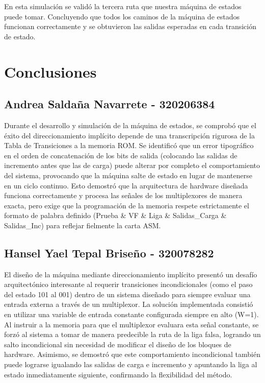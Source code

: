 \documentclass[12pt, letterpaper]{article}
\begin{document}
En esta simulación se validó la tercera ruta que nuestra máquina de estados puede tomar. Concluyendo que todos los caminos de la máquina de estados funcionan correctamente y se obtuvieron las salidas esperadas en cada transición de estado.

\section*{Conclusiones}

\subsection*{Andrea Saldaña Navarrete - 320206384}

Durante el desarrollo y simulación de la máquina de estados, se comprobó que el éxito del direccionamiento implícito depende de una transcripción rigurosa de la Tabla de Transiciones a la memoria ROM. Se identificó que un error tipográfico en el orden de concatenación de los bits de salida (colocando las salidas de incremento antes que las de carga) puede alterar por completo el comportamiento del sistema, provocando que la máquina salte de estado en lugar de mantenerse en un ciclo continuo. Esto demostró que la arquitectura de hardware diseñada funciona correctamente y procesa las señales de los multiplexores de manera exacta, pero exige que la programación de la memoria respete estrictamente el formato de palabra definido (Prueba \& VF \& Liga \& Salidas\_Carga \& Salidas\_Inc) para reflejar fielmente la carta ASM.

\subsection*{Hansel Yael Tepal Briseño - 320078282}

El diseño de la máquina mediante direccionamiento implícito presentó un desafío arquitectónico interesante al requerir transiciones incondicionales (como el paso del estado 101 al 001) dentro de un sistema diseñado para siempre evaluar una entrada externa a través de un multiplexor. La solución implementada consistió en utilizar una variable de entrada constante configurada siempre en alto (W=1). Al instruir a la memoria para que el multiplexor evaluara esta señal constante, se forzó al sistema a tomar de manera predecible la ruta de la liga falsa, logrando un salto incondicional sin necesidad de modificar el diseño de los bloques de hardware. Asimismo, se demostró que este comportamiento incondicional también puede lograrse igualando las salidas de carga e incremento y apuntando la liga al estado inmediatamente siguiente, confirmando la flexibilidad del método.
\end{document}
